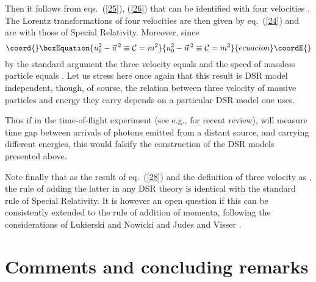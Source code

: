 \documentclass  [12pt] {article}
\begin{document}
Then it follows from eqs.~(\ref{25}), (\ref{26}) that \coordHE{} can be identified with four velocities \coordHE{}. The Lorentz
transformations of four velocities are then given by eq.~(\ref{24}) and are
with those of  Special Relativity. Moreover, since
\begin{equation}\coord{}\boxEquation{\label{28}
 u_0^2 - \vec{u}\,{}^2 \equiv {\cal C} = m^2
}{u_0^2 - \vec{u}\,{}^2 \equiv {\cal C} = m^2
}{ecuacion}\coordE{}\end{equation}
by the standard argument the three velocity equals \coordHE{} and the
speed of massless particle equals \coordHE{}.  Let us stress here once again that this
result is DSR model independent, though, of course, the relation between three
velocity of massive particles and energy they carry depends on a particular DSR
model one uses.

Thus if in the time-of-flight experiment (see e.g.,
\cite{Amelino-Camelia:2002vw} for recent review), will measure  time gap
between arrivals of photons emitted from a distant source, and carrying
different energies,  this would falsify the construction of the DSR models
presented above.

Note finally that as the result of eq.~(\ref{28}) and the definition of three
velocity as \coordHE{}, the rule of adding the latter in any DSR theory is
identical with the standard rule of Special Relativity. It is however an open
question if this can be consistently extended to the rule of addition of
momenta, following the considerations of Lukierski and Nowicki
\cite{Lukierski:2002df} and  Judes and Visser \cite{Judes:2002bw}.

\section{Comments and concluding remarks}
\end{document}
